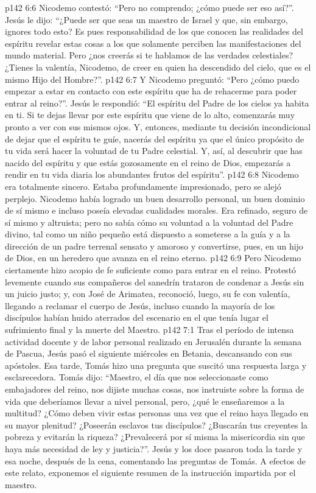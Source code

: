 \vs p142 6:6 Nicodemo contestó: “Pero no comprendo; ¿cómo puede ser eso así?”. Jesús le dijo: “¿Puede ser que seas un maestro de Israel y que, sin embargo, ignores todo esto? Es pues responsabilidad de los que conocen las realidades del espíritu revelar estas cosas a los que solamente perciben las manifestaciones del mundo material. Pero ¿nos creerás si te hablamos de las verdades celestiales? ¿Tienes la valentía, Nicodemo, de creer en quien ha descendido del cielo, que es el mismo Hijo del Hombre?”.
\vs p142 6:7 Y Nicodemo preguntó: “Pero ¿cómo puedo empezar a estar en contacto con este espíritu que ha de rehacerme para poder entrar al reino?”. Jesús le respondió: “El espíritu del Padre de los cielos ya habita en ti. Si te dejas llevar por este espíritu que viene de lo alto, comenzarás muy pronto a ver con sus mismos ojos. Y, entonces, mediante tu decisión incondicional de dejar que el espíritu te guíe, nacerás del espíritu ya que el único propósito de tu vida será hacer la voluntad de tu Padre celestial. Y, así, al descubrir que has nacido del espíritu y que estás gozosamente en el reino de Dios, empezarás a rendir en tu vida diaria los abundantes frutos del espíritu”.
\vs p142 6:8 Nicodemo era totalmente sincero. Estaba profundamente impresionado, pero se alejó perplejo. Nicodemo había logrado un buen desarrollo personal, un buen dominio de sí mismo e incluso poseía elevadas cualidades morales. Era refinado, seguro de sí mismo y altruista; pero no sabía cómo  su voluntad a la voluntad del Padre divino, tal como un niño pequeño está dispuesto a someterse a la guía y a la dirección de un padre terrenal sensato y amoroso y convertirse, pues, en un hijo de Dios, en un heredero que avanza en el reino eterno.
\vs p142 6:9 Pero Nicodemo ciertamente hizo acopio de fe suficiente como para entrar en el reino. Protestó levemente cuando sus compañeros del sanedrín trataron de condenar a Jesús sin un juicio justo; y, con José de Arimatea, reconoció, luego, su fe con valentía, llegando a reclamar el cuerpo de Jesús, incluso cuando la mayoría de los discípulos habían huido aterrados del escenario en el que tenía lugar el sufrimiento final y la muerte del Maestro.
\vs p142 7:1 Tras el período de intensa actividad docente y de labor personal realizado en Jerusalén durante la semana de Pascua, Jesús pasó el siguiente miércoles en Betania, descansando con sus apóstoles. Esa tarde, Tomás hizo una pregunta que suscitó una respuesta larga y esclarecedora. Tomás dijo: “Maestro, el día que nos seleccionaste como embajadores del reino, nos dijiste muchas cosas, nos instruiste sobre la forma de vida que deberíamos llevar a nivel personal, pero, ¿qué le enseñaremos a la multitud? ¿Cómo deben vivir estas personas una vez que el reino haya llegado en su mayor plenitud? ¿Poseerán esclavos tus discípulos? ¿Buscarán tus creyentes la pobreza y evitarán la riqueza? ¿Prevalecerá por sí misma la misericordia sin que haya más necesidad de ley y justicia?”. Jesús y los doce pasaron toda la tarde y esa noche, después de la cena, comentando las preguntas de Tomás. A efectos de este relato, exponemos el siguiente resumen de la instrucción impartida por el maestro.
